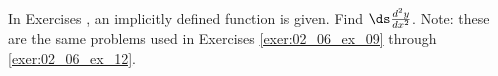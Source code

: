 {\noindent In Exercises}
{, an implicitly defined function is given. Find $\ds \frac{d^2y}{dx^2}$. Note: these are the same problems used in Exercises \ref{exer:02_06_ex_09} through \ref{exer:02_06_ex_12}.
}

